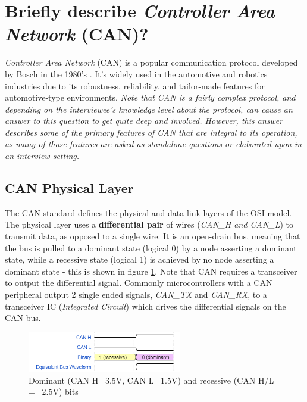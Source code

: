 \documentclass[main.tex]{subfiles}
\begin{document}
\section{Briefly describe \textit{Controller Area Network} (CAN)?}

\spoilerline
\noindent \textit{Controller Area Network} (CAN) is a popular communication protocol developed by Bosch in the 1980's \cite{cadence_canbus_history}. It's widely used in the automotive and robotics industries due to its robustness, reliability, and tailor-made features for automotive-type environments.\newline
\newnoindentpara \textit{Note that CAN is a fairly complex protocol, and depending on the interviewee's knowledge level about the protocol, can cause an answer to this question to get quite deep and involved. However, this answer describes some of the primary features of CAN that are integral to its operation, as many of those features are asked as standalone questions or elaborated upon in an interview setting.} \newline

\subsection{CAN Physical Layer}
The CAN standard defines the physical and data link layers of the OSI model. The physical layer uses a \textbf{differential pair} of wires (\textit{CAN\_H and CAN\_L}) to transmit data, as opposed to a single wire. It is an open-drain bus, meaning that the bus is pulled to a dominant state (logical 0) by a node asserting a dominant state, while a recessive state (logical 1) is achieved by no node asserting a dominant state - this is shown in figure \ref{fig:can-dominant-recessive}. Note that CAN requires a transceiver to output the differential signal. Commonly microcontrollers with a CAN peripheral output 2 single ended signals, \textit{CAN\_TX} and \textit{CAN\_RX}, to a transceiver IC (\textit{Integrated Circuit}) which drives the differential signals on the CAN bus. 

\begin{figure}[H]
    \centering
    \includegraphics[width=0.6\textwidth]{images/can_dominant_recessive.png}
    \caption{Dominant (CAN H ~3.5V, CAN L ~1.5V) and recessive (CAN H/L = ~2.5V) bits \cite{ti_can_signal_levels}}
    \label{fig:can-dominant-recessive}
\end{figure}
\end{document}
